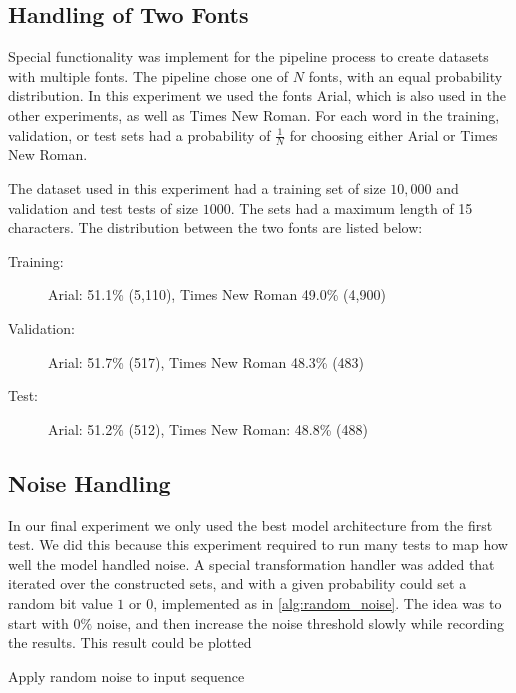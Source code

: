 \subsection{Handling of Two Fonts}
Special functionality was implement for the pipeline process to create datasets with multiple fonts. The pipeline chose one of \(N\) fonts, with an equal probability distribution. In this experiment we used the fonts Arial, which is also used in the other experiments, as well as Times New Roman. For each word in the training, validation, or test sets had a probability of \(\frac{1}{N}\) for choosing either Arial or Times New Roman.

The dataset used in this experiment had a training set of size \(10,000\) and validation and test tests of size \(1000\). The sets had a maximum length of 15 characters. The distribution between the two fonts are listed below:

\vspace{0.5cm}
\begin{minipage}{0.8\linewidth}
    \begin{description}
        \item[Training:]{Arial: 51.1\% (5,110), Times New Roman 49.0\% (4,900)}
        \item[Validation:]{Arial: 51.7\% (517), Times New Roman 48.3\% (483)}
        \item[Test:]{Arial: 51.2\% (512), Times New Roman: 48.8\% (488)}
    \end{description}
\end{minipage}

\subsection{Noise Handling}
In our final experiment we only used the best model architecture from the first test. We did this because this experiment required to run many tests to map how well the model handled noise. A special transformation handler was added that iterated over the constructed sets, and with a given probability could set a random bit value \(1\) or \(0\), implemented as in \ref{alg:random_noise}. The idea was to start with \(0\%\) noise, and then increase the noise threshold slowly while recording the results. This result could be plotted

\begin{algorithm}
    \caption{Apply random noise to input sequence
        \label{alg:random_noise}}
    \begin{algorithmic}[1]
        \Statex
                \EndIf
            \EndFor
        \State {}
        \EndFunction
    \end{algorithmic}
\end{algorithm}


